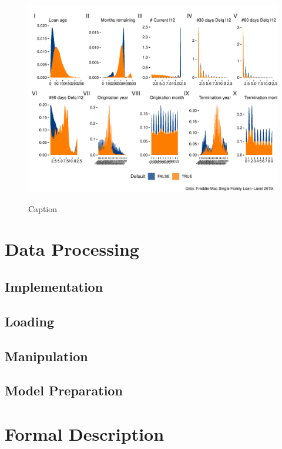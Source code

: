 \begin{figure}[H]
    \centering
    \includegraphics[width = \textwidth]{Figures/pw_7.pdf}
    \label{fig:my_label}
    \caption{Caption}
\end{figure}

        
\section{Data Processing}
    
        \subsection{Implementation}
        
        \subsection{Loading}
        
        \subsection{Manipulation}
        
        \subsection{Model Preparation}
        
    \section{Formal Description}
    
